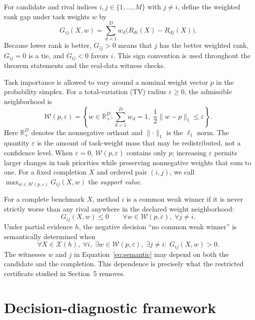 \documentclass[preprint,11pt]{elsarticle}
\begin{document}
For candidate and rival indices $i,j\in\{1,\ldots,M\}$ with $j\ne i$, define the weighted rank gap under task weights $w$ by
\begin{equation}\label{eq:gap}
G_{ij}(X,w)=\sum_{d=1}^{D} w_d\bigl(R_{di}(X)-R_{dj}(X)\bigr).
\end{equation}
Because lower rank is better, $G_{ij}>0$ means that $j$ has the better weighted rank, $G_{ij}=0$ is a tie, and $G_{ij}<0$ favors $i$. This sign convention is used throughout the theorem statements and the real-data witness checks.

Task importance is allowed to vary around a nominal weight vector $p$ in the probability simplex. For a total-variation (TV) radius $\varepsilon\ge0$, the admissible neighborhood is
\begin{equation}\label{eq:tv}
\mathcal W(p,\varepsilon)=\left\{w\in\mathbb R_+^D:\sum_{d=1}^{D}w_d=1,\;\frac12\lVert w-p\rVert_1\le\varepsilon\right\}.
\end{equation}
Here $\mathbb R_+^D$ denotes the nonnegative orthant and $\lVert\cdot\rVert_1$ is the $\ell_1$ norm. The quantity $\varepsilon$ is the amount of task-weight mass that may be redistributed, not a confidence level. When $\varepsilon=0$, $\mathcal W(p,\varepsilon)$ contains only $p$; increasing $\varepsilon$ permits larger changes in task priorities while preserving nonnegative weights that sum to one. For a fixed completion $X$ and ordered pair $(i,j)$, we call $\max_{w\in\mathcal W(p,\varepsilon)}G_{ij}(X,w)$ the \emph{support value}.

For a complete benchmark $X$, method $i$ is a common weak winner if it is never strictly worse than any rival anywhere in the declared weight neighborhood:
\begin{equation}\label{eq:cww}
G_{ij}(X,w)\le 0\qquad \forall w\in\mathcal W(p,\varepsilon),\;\forall j\ne i.
\end{equation}
Under partial evidence $h$, the negative decision ``no common weak winner'' is semantically determined when
\begin{equation}\label{eq:semantic}
\forall X\in\mathcal X(h),\;\forall i,\;\exists w\in\mathcal W(p,\varepsilon),\;\exists j\ne i:\;G_{ij}(X,w)>0.
\end{equation}
The witnesses $w$ and $j$ in Equation~\eqref{eq:semantic} may depend on both the candidate and the completion. This dependence is precisely what the restricted certificate studied in Section~5 removes.

\section{Decision-diagnostic framework}
\end{document}

